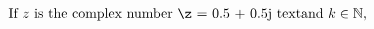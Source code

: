 \documentclass[preview]{standalone}
\begin{document}
\begin{align*}
\text{If $z$ is the complex number \z = 0.5 + 0.5j text{and $k \in \mathbb{N}$, }}
\end{align*}
\end{document}
